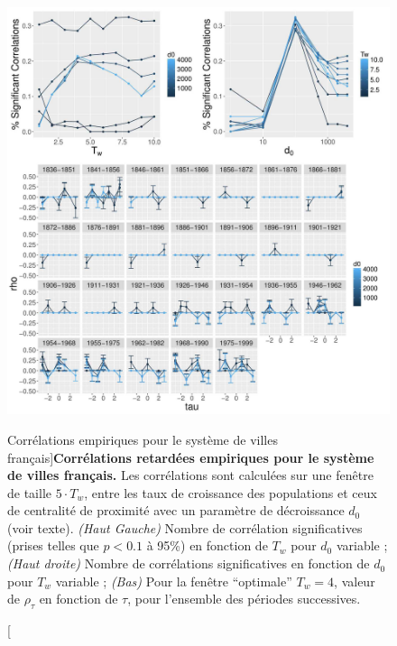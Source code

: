 \begin{figure}
	\includegraphics[width=\linewidth]{Figures/Final/6-2-3-fig-macrocoevol-empirical.jpg}
	\caption[Empirical Lagged Correlations for French City System][Corrélations empiriques pour le système de villes français]{\label{fig:macrocoevol:empirical}}{\textbf{Corrélations retardées empiriques pour le système de villes français.} Les corrélations sont calculées sur une fenêtre de taille $5\cdot T_w$, entre les taux de croissance des populations et ceux de centralité de proximité avec un paramètre de décroissance $d_0$ (voir texte). \textit{(Haut Gauche)} Nombre de corrélation significatives (prises telles que $p<0.1$ à 95\%) en fonction de $T_w$ pour $d_0$ variable ; \textit{(Haut droite)} Nombre de corrélations significatives en fonction de $d_0$ pour $T_w$ variable ; \textit{(Bas)} Pour la fenêtre ``optimale'' $T_w=4$, valeur de $\rho_{\tau}$ en fonction de $\tau$, pour l'ensemble des périodes successives.\label{fig:macrocoevol:empirical}}
\end{figure}









